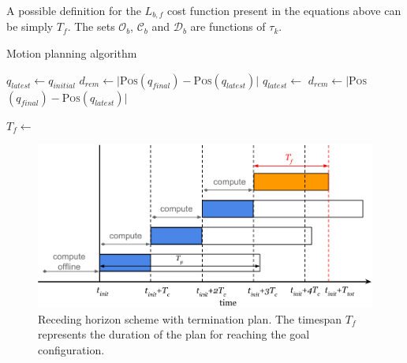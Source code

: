 A possible definition for the $L_{b,f}$ cost function present in the equations above can be simply $T_f$.
The sets $\mathcal{O}_b$, $\mathcal{C}_b$ and $\mathcal{D}_b$ are functions of
$\tau_k$.



\begin{algorithm}
    \caption{Motion planning algorithm\label{cod:algo}}
    \label{swpa}
    \begin{algorithmic}[1] %
	    \State $q_{latest} \gets q_{initial}$
	    \State $d_{rem} \gets |${\scshape Pos}$(q_{final}) - ${\scshape Pos}$(q_{latest})|$
	    \State {}
		\State $q_{latest} \gets $
		\State $d_{rem} \gets |${\scshape Pos}$(q_{final}) - ${\scshape Pos}$(q_{latest})|$
		
	    \EndWhile\label{planningwhile}
	    \State {}
	    \State $T_f \gets $
	    
        \EndProcedure
    \end{algorithmic}
\end{algorithm}

\begin{figure}[!h]
  \centering
  \includegraphics[width=.45\linewidth]{./images/receding_horizon/recedinghorizon2.png} %
  \caption{Receding horizon scheme with termination plan. The timespan $T_f$ represents the duration of the plan for reaching the goal configuration.\label{fig:recedinghor}}
\end{figure}




